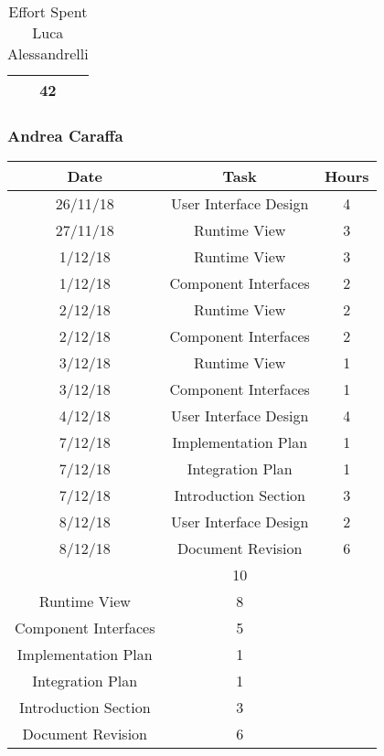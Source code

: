 \begin{table}[h]
\begin{tabular}{|c|c|c|}
\rowcolor[HTML]{FE996B} 
\multicolumn{2}{|c|}{\cellcolor[HTML]{FE996B}Total} & \cellcolor[HTML]{FFFC9E}42 \\ \hline
\end{tabular}
\caption{Effort Spent Luca Alessandrelli}
\end{table}

\clearpage
\newpage

\subsubsection{Andrea Caraffa}
\begin{table}[h]
\centering
\begin{tabular}{|c|c|c|}
\hline
\rowcolor[HTML]{FE996B} 
Date & Task & Hours 
\\ \hline
\rowcolor[HTML]{FFFC9E} 
26/11/18  & User Interface Design & 4
\\ \hline
\rowcolor[HTML]{FFFC9E} 
27/11/18 & Runtime View & 3 
\\ \hline
\rowcolor[HTML]{FFFC9E}
1/12/18 & Runtime View & 3
\\ \hline
\rowcolor[HTML]{FFFC9E}
1/12/18 & Component Interfaces & 2
\\ \hline
\rowcolor[HTML]{FFFC9E}
2/12/18 & Runtime View & 2
\\ \hline
\rowcolor[HTML]{FFFC9E}
2/12/18 & Component Interfaces & 2
\\ \hline
\rowcolor[HTML]{FFFC9E}
3/12/18 & Runtime View & 1
\\ \hline
\rowcolor[HTML]{FFFC9E}
3/12/18 & Component Interfaces & 1
\\ \hline
\rowcolor[HTML]{FFFC9E}
4/12/18 & User Interface Design & 4
\\ \hline
\rowcolor[HTML]{FFFC9E}
7/12/18 & Implementation Plan & 1
\\ \hline
\rowcolor[HTML]{FFFC9E}
7/12/18 & Integration Plan & 1
\\ \hline
\rowcolor[HTML]{FFFC9E}
7/12/18 & Introduction Section & 3
\\ \hline
\rowcolor[HTML]{FFFC9E}
8/12/18 & User Interface Design & 2
\\ \hline
\rowcolor[HTML]{FFFC9E}
8/12/18 & Document Revision & 6
\\ \hline


\rowcolor[HTML]{FFCE93} 
\multicolumn{2}{|c|}{User Interface Design} & 10 \\ 
\hline
\rowcolor[HTML]{FFCE93} 
\multicolumn{2}{|c|} {Runtime View} & 8 \\
\hline
\rowcolor[HTML]{FFCE93} 
\multicolumn{2}{|c|} {Component Interfaces} & 5 \\
\hline
\rowcolor[HTML]{FFCE93} 
\multicolumn{2}{|c|} {Implementation Plan} & 1 \\
\hline
\rowcolor[HTML]{FFCE93} 
\multicolumn{2}{|c|} {Integration Plan} & 1 \\
\hline
\rowcolor[HTML]{FFCE93} 
\multicolumn{2}{|c|} {Introduction Section} & 3 \\
\hline
\rowcolor[HTML]{FFCE93} 
\multicolumn{2}{|c|} {Document Revision} & 6  \\
\hline



\end{tabular}
\end{table}
